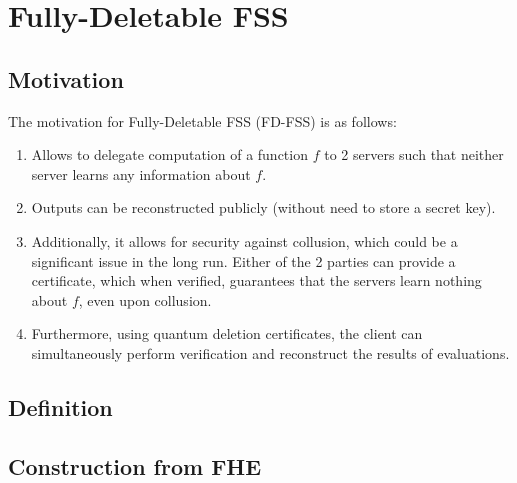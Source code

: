 \section{Fully-Deletable FSS}\label{fd-fss}

\subsection{Motivation}

The motivation for Fully-Deletable FSS (FD-FSS) is as follows:

\begin{enumerate}
\item Allows to delegate computation of a function $f$ to 2 servers
such that neither server learns any information about $f$.

\item Outputs can be reconstructed publicly (without need to store a
secret key).

\item Additionally, it allows for security against collusion, which
could be a significant issue in the long run. Either of the
2 parties can provide a certificate, which when verified, guarantees
that the servers learn nothing about $f$, even upon collusion.

\item Furthermore, using quantum deletion certificates, the client
can simultaneously perform verification and reconstruct the results
of evaluations.
\end{enumerate}

\subsection{Definition}

\subsection{Construction from FHE}

